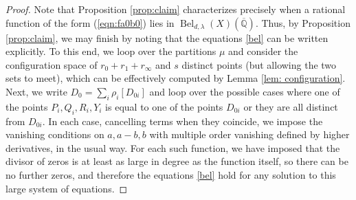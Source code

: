 \documentclass{amsproc}
\numberwithin{equation}{section}
\numberwithin{figure}{section}
\theoremstyle{definition}
\theoremstyle{remark}
\DeclareMathOperator{\opdiv}{div}
\newcommand{\Qbar}{\overline{\mathbb{Q}}}
\newcommand\PP{\mathbb{P}}
\DeclareMathOperator{\Bel}{Bel}
\newcommand{\aj}[1]{{\color{magenta} \textsf{[[#1]]}}}
\begin{document}
\begin{proof}
Note that Proposition \ref{prop:claim} characterizes precisely when a rational function of the form (\ref{eqn:fa0b0}) lies in $\Bel_{d,\lambda}(X)(\Qbar)$.
Thus, by Proposition \ref{prop:claim}, we may finish by noting that the equations \eqref{bel} can be written explicitly.    To this end, we loop over the partitions $\mu$ and consider the configuration space of $r_0+r_1+r_\infty$ and $s$ distinct points (but allowing the two sets to meet), which can be effectively computed by Lemma \ref{lem: configuration}. %
Next, we write $D_0=\sum_i \rho_i [D_{0i}]$ and loop over the possible cases where one of the points $P_i,Q_i,R_i,Y_i$ is equal to one of the points $D_{0i}$ or they are all distinct from $D_{0i}$.  In each case, cancelling terms when they coincide, we impose the vanishing conditions on $a,a-b,b$ with multiple order vanishing defined by higher derivatives, in the usual way.  For each such function, we have imposed that the divisor of zeros is at least as large in degree as the function itself, so there can be no further zeros, and therefore the equations \eqref{bel} hold for any solution to this large system of equations.  

\end{proof}
\end{document}
